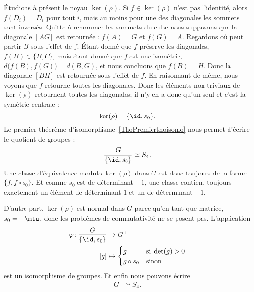Étudions à présent le noyau \( \ker(\rho)\). Si \( f\in\ker(\rho)\) n'est pas l'identité, alors \( f(D_i)=D_i\) pour tout \( i\), mais au moins pour une des diagonales les sommets sont inversés. Quitte à renommer les sommets du cube nous supposons que la diagonale \( [AG]\) est retournée : \( f(A)=G\) et \( f(G)=A\). Regardons où peut partir \( B\) sous l'effet de \( f\). Étant donné que \( f\) préserve les diagonales, \( f(B)\in\{ B,C \}\), mais étant donné que \( f\) est une isométrie, \( d\big( f(B),f(G) \big)=d(B,G)\), et nous concluons que \( f(B)=H\). Donc la diagonale \( [BH]\) est retournée sous l'effet de \( f\). En raisonnant de même, nous voyons que \( f\) retourne toutes les diagonales. Donc les éléments non triviaux de \( \ker(\rho)\) retournent toutes les diagonales; il n'y en a donc qu'un seul et c'est la symétrie centrale :
\begin{equation}
    \ker(\rho)=\{ \id,s_0 \}.
\end{equation}
Le premier théorème d'isomorphisme~\ref{ThoPremierthoisomo} nous permet d'écrire le quotient de groupes :
\begin{equation}
    \frac{ G }{ \{ \id,s_0 \} }\simeq S_4.
\end{equation}
Une classe d'équivalence modulo \( \ker(\rho)\) dans \( G\) est donc toujours de la forme \( \{ f,f\circ s_0 \}\). Et comme \( s_0\) est de déterminant \( -1\), une classe contient toujours exactement un élément de déterminant \( 1\) et un de déterminant \( -1\).

D'autre part, \( \ker(\rho)\) est normal dans \( G\) parce qu'en tant que matrice, \( s_0=-\mtu\), donc les problèmes de commutativité ne se posent pas. L'application
\begin{equation}
    \begin{aligned}
        \varphi\colon \frac{ G }{ \{ \id,s_0 \} }&\to G^+ \\
        [g]&\mapsto \begin{cases}
            g    &   \text{si } \det(g)>0\\
            g\circ s_0    &    \text{sinon}
        \end{cases}
    \end{aligned}
\end{equation}
est un isomorphisme de groupes. Et enfin nous pouvons écrire
\begin{equation}
    G^+\simeq S_4.
\end{equation}

